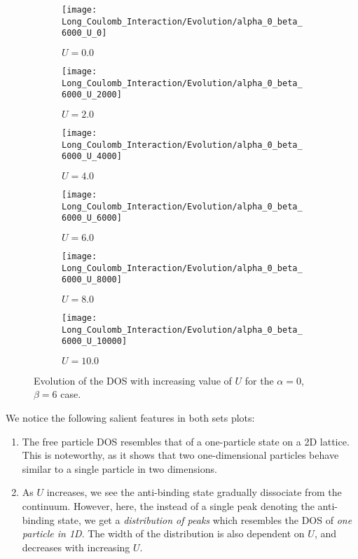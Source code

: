 \documentclass[a4paper, 11pt]{report}
\begin{document}
\begin{figure}[p!]
	\centering
	\begin{subfigure}{0.3\linewidth}
		\texttt{[image: Long\_Coulomb\_Interaction/Evolution/alpha\_0\_beta\_6000\_U\_0]}
		\caption{$U = 0.0$}
	\end{subfigure}
	\begin{subfigure}{0.3\linewidth}
		\texttt{[image: Long\_Coulomb\_Interaction/Evolution/alpha\_0\_beta\_6000\_U\_2000]}
		\caption{$U = 2.0$}
	\end{subfigure}
	\begin{subfigure}{0.3\linewidth}
		\texttt{[image: Long\_Coulomb\_Interaction/Evolution/alpha\_0\_beta\_6000\_U\_4000]}
		\caption{$U = 4.0$}
	\end{subfigure}
	\begin{subfigure}{0.3\linewidth}
		\texttt{[image: Long\_Coulomb\_Interaction/Evolution/alpha\_0\_beta\_6000\_U\_6000]}
		\caption{$U = 6.0$}
	\end{subfigure}
	\begin{subfigure}{0.3\linewidth}
		\texttt{[image: Long\_Coulomb\_Interaction/Evolution/alpha\_0\_beta\_6000\_U\_8000]}
		\caption{$U = 8.0$}
	\end{subfigure}
	\begin{subfigure}{0.3\linewidth}
		\texttt{[image: Long\_Coulomb\_Interaction/Evolution/alpha\_0\_beta\_6000\_U\_10000]}
		\caption{$U = 10.0$}
	\end{subfigure}
	\caption{Evolution of the DOS with increasing value of $U$ for the $\alpha = 0$, $\beta = 6$ case.}
\end{figure}

We notice the following salient features in both sets plots:
\begin{enumerate}
\item The free particle DOS resembles that of a one-particle state on a 2D lattice. This is noteworthy, as it shows that two one-dimensional particles behave similar to a single particle in two dimensions.

\item As $U$ increases, we see the anti-binding state gradually dissociate from the continuum. However, here, the instead of a single peak denoting the anti-binding state, we get a \textit{distribution of peaks} which resembles the DOS of \textit{one particle in 1D}. The width of the distribution is also dependent on $U$, and decreases with increasing $U$.
\end{enumerate}
\end{document}
